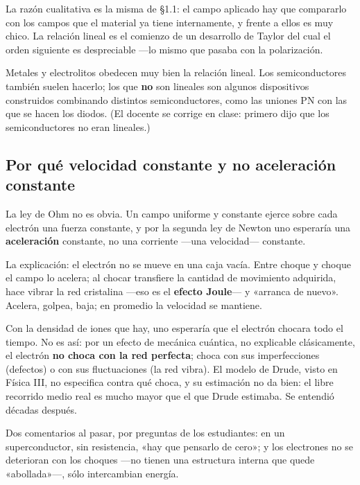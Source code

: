 \documentclass[12pt,a4paper]{article}
\begin{document}
La razón cualitativa es la misma de §1.1: el campo aplicado hay que compararlo
con los campos que el material ya tiene internamente, y frente a ellos es muy
chico. La relación lineal es el comienzo de un desarrollo de Taylor del cual el
orden siguiente es despreciable ---lo mismo que pasaba con la polarización.

Metales y electrolitos obedecen muy bien la relación lineal. Los
semiconductores también suelen hacerlo; los que \textbf{no} son lineales son algunos
dispositivos construidos combinando distintos semiconductores, como las uniones
PN con las que se hacen los diodos. (El docente se corrige en clase: primero
dijo que los semiconductores no eran lineales.)

\subsection{Por qué velocidad constante y no aceleración constante}

La ley de Ohm no es obvia. Un campo uniforme y constante ejerce sobre cada
electrón una fuerza constante, y por la segunda ley de Newton uno esperaría una
\textbf{aceleración} constante, no una corriente ---una velocidad--- constante.

La explicación: el electrón no se mueve en una caja vacía. Entre choque y
choque el campo lo acelera; al chocar transfiere la cantidad de movimiento
adquirida, hace vibrar la red cristalina ---eso es el \textbf{efecto Joule}--- y
«arranca de nuevo». Acelera, golpea, baja; en promedio la velocidad se
mantiene.

\begin{notebox}
Con la densidad de iones que hay, uno esperaría que el
electrón chocara todo el tiempo. No es así: por un efecto de mecánica
cuántica, no explicable clásicamente, el electrón \textbf{no choca con la red
perfecta}; choca con sus imperfecciones (defectos) o con sus fluctuaciones
(la red vibra). El modelo de Drude, visto en Física III, no especifica contra
qué choca, y su estimación no da bien: el libre recorrido medio real es mucho
mayor que el que Drude estimaba. Se entendió décadas después.
\end{notebox}

Dos comentarios al pasar, por preguntas de los estudiantes: en un
superconductor, sin resistencia, «hay que pensarlo de cero»; y los electrones no
se deterioran con los choques ---no tienen una estructura interna que quede
«abollada»---, sólo intercambian energía.
\end{document}
